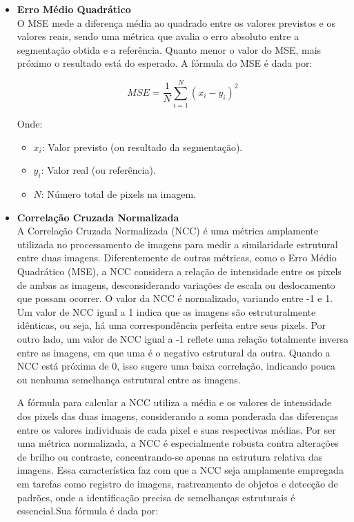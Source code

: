 \begin{itemize}
    \item \textbf{Erro Médio Quadrático} \\
    O MSE mede a diferença média ao quadrado entre os valores previstos e os valores reais, sendo uma métrica que avalia o erro absoluto entre a segmentação obtida e a referência. Quanto menor o valor do MSE, mais próximo o resultado está do esperado. A fórmula do MSE é dada por:

    \[
    MSE = \frac{1}{N} \sum_{i=1}^{N} (x_i - y_i)^2
    \]

    Onde:
    \begin{itemize}
        \item \( x_i \): Valor previsto (ou resultado da segmentação).
        \item \( y_i \): Valor real (ou referência).
        \item \( N \): Número total de pixels na imagem.
    \end{itemize}

    \item \textbf{Correlação Cruzada Normalizada} \\
    
    A Correlação Cruzada Normalizada (NCC) é uma métrica amplamente utilizada no processamento de imagens para medir a similaridade estrutural entre duas imagens. Diferentemente de outras métricas, como o Erro Médio Quadrático (MSE), a NCC considera a relação de intensidade entre os pixels de ambas as imagens, desconsiderando variações de escala ou deslocamento que possam ocorrer. O valor da NCC é normalizado, variando entre -1 e 1. Um valor de NCC igual a 1 indica que as imagens são estruturalmente idênticas, ou seja, há uma correspondência perfeita entre seus pixels. Por outro lado, um valor de NCC igual a -1 reflete uma relação totalmente inversa entre as imagens, em que uma é o negativo estrutural da outra. Quando a NCC está próxima de 0, isso sugere uma baixa correlação, indicando pouca ou nenhuma semelhança estrutural entre as imagens.

    A fórmula para calcular a NCC utiliza a média e os valores de intensidade dos pixels das duas imagens, considerando a soma ponderada das diferenças entre os valores individuais de cada pixel e suas respectivas médias. Por ser uma métrica normalizada, a NCC é especialmente robusta contra alterações de brilho ou contraste, concentrando-se apenas na estrutura relativa das imagens. Essa característica faz com que a NCC seja amplamente empregada em tarefas como registro de imagens, rastreamento de objetos e detecção de padrões, onde a identificação precisa de semelhanças estruturais é essencial.Sua fórmula é dada por:


\end{itemize}
